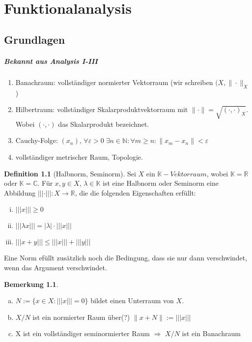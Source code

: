 \documentclass[ngerman]{report}
\theoremstyle{plain}%
\theoremstyle{definition}%
\newtheorem{definition}[thm]{Definition}
\theoremstyle{myStyle}
\newtheorem{bem}[thm]{Bemerkung}
\newcommand{\C}{\mathbb{C}}
\newcommand{\R}{\mathbb{R}}
\newcommand{\N}{\mathbb{N}}
\newcommand{\K}{\mathbb{K}}
\newcommand{\seminorm}[1]{||| #1 |||}
\newcommand{\norm}[1]{\|#1\|}
\begin{document}
\chapter{Funktionalanalysis}
\section{Grundlagen}

\paragraph{Bekannt aus Analysis I-III}

\begin{enumerate}[-]
	\item Banachraum: vollständiger normierter Vektorraum (wir schreiben $(X,\norm{\cdot }_X$) 
	\item Hilbertraum: vollständiger Skalarproduktvektorraum mit $\norm{\cdot } = \sqrt{(\cdot , \cdot )_X}$.  Wobei $(\cdot , \cdot )$ das Skalarprodukt bezeichnet.
	\item Cauchy-Folge: 
					$(x_n),\,  \forall \varepsilon > 0\; \exists n \in \N : \forall m \geq n : \norm{x_m-x_n}<\varepsilon$
	\item vollständiger metrischer Raum, Topologie.
\end{enumerate}

\begin{definition}[Halbnorm, Seminorm]

	Sei $X$ ein $\K-Vektorraum$, wobei $\K = \R$ oder $\K = \C$. 
	Für $x,y\in X$, $\lambda \in \K$ ist eine Halbnorm oder Seminorm eine Abbildung
	$\seminorm{\cdot}:X \rightarrow \R$, die die folgenden Eigenschaften erfüllt:

		\begin{enumerate}[(i)]
			\item $\seminorm{x}\geq 0$
			\item $\seminorm{\lambda x} = |\lambda|\cdot \seminorm{x}$
			\item $\seminorm{x+y} \leq \seminorm{x} + \seminorm{y}$
		\end{enumerate}
\end{definition}

Eine Norm efüllt zusätzlich noch die Bedingung, dass sie nur dann verschwindet, wenn das Argument verschwindet.

\begin{bem}
	\begin{enumerate}[(a)]
		\item $N:=\{x\in X: \seminorm{x}=0\}$ bildet einen Unterraum von $X$.
		\item $X/N$ ist ein normierter Raum über(?) $\norm{x+N} := \seminorm{x}$
		\item X ist ein vollständiger seminormierter Raum $\Rightarrow$ $X/N$ ist ein Banachraum 
	\end{enumerate}
\end{bem}
\end{document}
